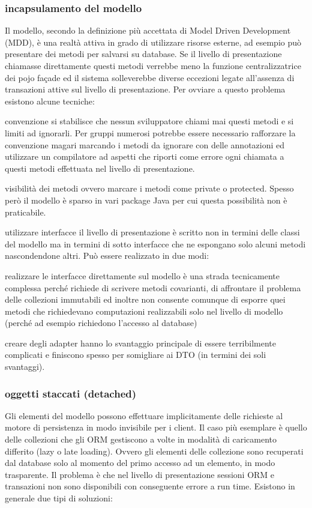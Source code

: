 \subsubsection{incapsulamento del modello}
Il modello, secondo la definizione più accettata di Model Driven Development (MDD), è una realtà attiva in grado di utilizzare risorse esterne, ad esempio può presentare dei metodi per salvarsi su database. Se il livello di presentazione chiamasse direttamente questi metodi verrebbe meno la funzione centralizzatrice dei pojo façade ed il sistema solleverebbe diverse eccezioni legate all'assenza di transazioni attive sul livello di presentazione.
Per ovviare a questo problema esistono alcune tecniche:
\begin{description*}
  \item[convenzione] si stabilisce che nessun sviluppatore chiami mai questi metodi e si limiti ad ignorarli. Per gruppi numerosi potrebbe essere necessario rafforzare la convenzione magari marcando i metodi da ignorare con delle annotazioni ed utilizzare un compilatore ad aspetti che riporti come errore ogni chiamata a questi metodi effettuata nel livello di presentazione.
  \item[visibilità dei metodi]  ovvero marcare i metodi come private o protected. Spesso però il modello è sparso in vari package Java per cui questa possibilità non è praticabile.
 \item[utilizzare interfacce] il livello di presentazione è scritto non in termini delle classi del modello ma in termini di sotto interfacce che ne espongano solo alcuni metodi nascondendone altri. Può essere realizzato in due modi:
    \begin{description*}
      \item[realizzare le interfacce direttamente sul modello] è una strada tecnicamente complessa perché richiede di scrivere metodi covarianti, di affrontare il problema delle collezioni immutabili ed inoltre non consente comunque di esporre quei metodi che richiedevano computazioni realizzabili solo nel livello di modello (perché ad esempio richiedono l'accesso al database)
      \item[creare degli adapter] hanno lo svantaggio principale di essere terribilmente complicati e finiscono spesso per somigliare ai DTO (in termini dei soli svantaggi).
    \end{description*}
\end{description*}

\subsubsection{oggetti staccati (detached)}
Gli elementi del modello possono effettuare implicitamente delle richieste al motore di persistenza in modo invisibile per i client. Il caso più esemplare è quello delle collezioni che gli ORM gestiscono a volte in modalità di caricamento differito (lazy o late loading). Ovvero gli elementi delle collezione sono recuperati dal database solo al momento del primo accesso ad un elemento, in modo trasparente. Il problema è che nel livello di presentazione sessioni ORM e transazioni non sono disponibili con conseguente errore a run time. Esistono in generale due tipi di soluzioni:

